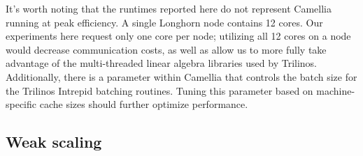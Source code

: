 \documentclass{article}
\begin{document}
It's worth noting that the runtimes reported here do not represent Camellia running at peak efficiency.  A single Longhorn node contains 12 cores.  Our experiments here request only one core per node; utilizing all 12 cores on a node would decrease communication costs, as well as allow us to more fully take advantage of the multi-threaded linear algebra libraries used by Trilinos.  Additionally, there is a parameter within Camellia that controls the batch size for the Trilinos Intrepid batching routines.  Tuning this parameter based on machine-specific cache sizes should further optimize performance.

\subsection{Weak scaling}
\end{document}
